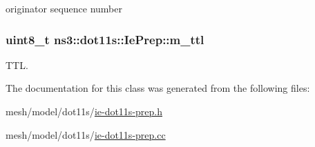 originator sequence number 

\subsubsection[{\texorpdfstring{m\+\_\+ttl}{m_ttl}}]{\setlength{\rightskip}{0pt plus 5cm}uint8\+\_\+t ns3\+::dot11s\+::\+Ie\+Prep\+::m\+\_\+ttl\hspace{0.3cm}{\ttfamily [private]}}\hypertarget{classns3_1_1dot11s_1_1IePrep_ac3d5f5372cde88e4f06476f61c8a846d}{}\label{classns3_1_1dot11s_1_1IePrep_ac3d5f5372cde88e4f06476f61c8a846d}


T\+TL. 



The documentation for this class was generated from the following files\+:\begin{DoxyCompactItemize}
\item 
mesh/model/dot11s/\hyperlink{ie-dot11s-prep_8h}{ie-\/dot11s-\/prep.\+h}\item 
mesh/model/dot11s/\hyperlink{ie-dot11s-prep_8cc}{ie-\/dot11s-\/prep.\+cc}\end{DoxyCompactItemize}
